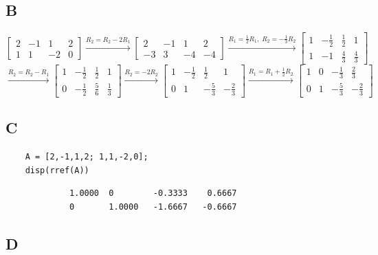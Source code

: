 \documentclass{article}
\begin{document}
\subsection*{B}

\[
	\begin{bmatrix}
		2 & -1 & 1  & 2 \\
		1 & 1  & -2 & 0
	\end{bmatrix}
	\xrightarrow{R_2 = R_2 - 2R_1}
	\begin{bmatrix}
		2  & -1 & 1  & 2  \\
		-3 & 3  & -4 & -4
	\end{bmatrix}
	\xrightarrow{R_1 = \frac{1}{2}R_1,\; R_2 = -\frac{1}{3}R_2}
	\begin{bmatrix}
		1 & -\frac{1}{2} & \frac{1}{2} & 1           \\
		1 & -1           & \frac{4}{3} & \frac{4}{3}
	\end{bmatrix}
\]
\[
	\xrightarrow{R_2 = R_2 - R_1}
	\begin{bmatrix}
		1 & -\frac{1}{2} & \frac{1}{2} & 1           \\
		0 & -\frac{1}{2} & \frac{5}{6} & \frac{1}{3}
	\end{bmatrix}
	\xrightarrow{R_2 = -2R_2}
	\begin{bmatrix}
		1 & -\frac{1}{2} & \frac{1}{2}  & 1            \\
		0 & 1            & -\frac{5}{3} & -\frac{2}{3}
	\end{bmatrix}
	\xrightarrow{R_1 = R_1 + \frac{1}{2}R_2}
	\begin{bmatrix}
		1 & 0 & -\frac{1}{3} & \frac{2}{3}  \\
		0 & 1 & -\frac{5}{3} & -\frac{2}{3}
	\end{bmatrix}
\]

\subsection*{C}

\begin{verbatim}
    A = [2,-1,1,2; 1,1,-2,0];
    disp(rref(A))
    \end{verbatim}
\color{lightgray}
\begin{verbatim}
             1.0000  0        -0.3333    0.6667
             0       1.0000   -1.6667   -0.6667
    \end{verbatim}
\color{black}

\subsection*{D}
\end{document}
